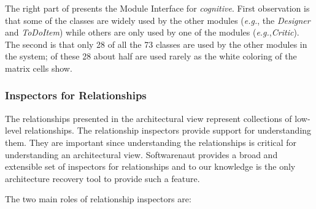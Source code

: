 \documentclass[preprint,12pt]{elsarticle}
\newcommand{\cd}[1]{{\em{#1}}}
\newcommand{\eg}{\emph{e.g.},\xspace}
\begin{document}
\begin{itemize}
The right part of  presents the Module Interface for \cd{cognitive}. First observation is that some of the classes are widely used by the other modules (\eg the \cd{Designer} and \cd{ToDoItem}) while others are only used by one of the modules (\eg \cd{Critic}). The second is that only 28 of all the 73 classes are used by the other modules in the system; of these 28 about half are used rarely as the white coloring of the matrix cells show.
\end{itemize}

\subsubsection {Inspectors for Relationships}

The relationships presented in the architectural view represent collections of low-level relationships. The relationship inspectors provide support for understanding them. They are important since understanding the relationships is critical for understanding an architectural view. Softwarenaut provides a broad and extensible set of inspectors for relationships \cite{lungu-cutedge, lungu-relevo} and to our knowledge is the only architecture recovery tool to provide such a feature. 

The two main roles of relationship inspectors are:
\end{document}
